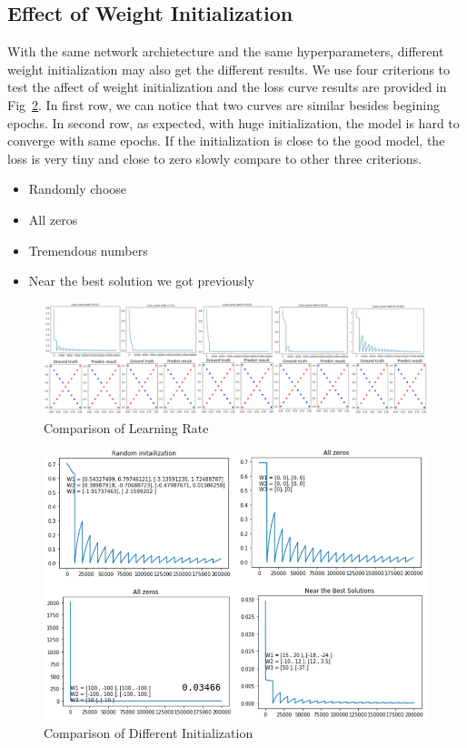 \documentclass[12pt,a4paper]{article}
\begin{document}
\subsection{Effect of Weight Initialization}
With the same network archietecture and the same hyperparameters, different weight initialization may also get the different results. We use four criterions to test the affect of weight initialization and the loss curve results are provided in Fig~\ref{fig:init}. In first row, we can notice that two curves are similar besides begining epochs. In second row, as expected, with huge initialization, the model is hard to converge with same epochs. If the initialization is close to the good model, the loss is very tiny and close to zero slowly compare to other three criterions.
\begin{itemize}
\item Randomly choose
\item All zeros
\item Tremendous numbers
\item Near the best solution we got previously
\end{itemize}
\begin{figure}[t!]
  \centering
  \includegraphics[scale=0.25]{lr_compare.png}
  \caption{Comparison of Learning Rate}
  \label{fig:lr_com}
\end{figure}
\begin{figure}
  \centering
  \includegraphics[scale=0.4]{initial_compare.png}
  \caption{Comparison of Different Initialization}
  \label{fig:init}
\end{figure}
\end{document}
